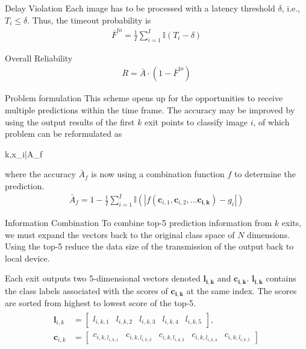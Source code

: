 \begin{enumdescript}
\begin{enumdescript}
\begin{enumdescript}
			\item[Delay Violation] Each image has to be processed with a latency threshold $ \delta $, i.e., $ T_{i} \leq \delta $. Thus, the timeout probability is
			\begin{align}
			\overline{F}^{to}=\frac{1}{I}\sum_{i=1}^{I} \mathbb{I}\left(T_{i}-\delta\right)
			\end{align}
			\item[Overall Reliability]\begin{align}
			R= \bar{A} \cdot (1-\overline{F}^{to})
			\end{align}
			
		\end{enumdescript}
		\item[Problem formulation] 
		This scheme opens up for the opportunities to receive multiple predictions within the time frame. The accuracy may be improved by using the output results of the first $ k $ exit points to classify image $ i $, of which problem can be reformulated as
		\begin{maxi}
			{k,x_i}{\bar{A}_f}
			{}{}
		\end{maxi}
		where the accuracy $ \bar{A}_f $ is now using a combination function $ f $ to determine the prediction.
		\begin{align*}
		\bar{A}_f = 1 - \frac{1}{I} \sum_{i=1}^{I}\mathbb{I}\left(\left|f\left(\mathbf{c}_{i,1}, \mathbf{c}_{i,2}, \dots \mathbf{c_{i,k}}\right)-g_i\right|\right)
		\end{align*}
		
		\item[Information Combination] To combine top-5 prediction information from $ k $ exits, we must expand the vectors back to the original class space of $ N $ dimensions. Using the top-5 reduce the data size of the transmission of the output back to local device. 
		
		Each exit outputs two 5-dimensional vectors denoted $\mathbf{l_{i,k}}$ and $ \mathbf{c_{i,k}}  $.
		$\mathbf{l_{i,k}}$ contains the class labels associated with the scores of $ \mathbf{c_{i,k}}  $ at the same index. The scores are sorted from highest to lowest score of the top-5.
		\begin{align}
		\begin{split}
		\mathbf{l}_{i,k} &= \begin{bmatrix}
		l_{i,k,1} & l_{i,k,2} & l_{i,k,3} & l_{i,k,4} & l_{i,k,5}
		\end{bmatrix}, \\
		\mathbf{c}_{i,k} &= \begin{bmatrix}
		c_{i,k,l_{i,k,1}} & c_{i,k,l_{i,k,2}} & c_{i,k,l_{i,k,3}} & c_{i,k,l_{i,k,4}} & c_{i,k,l_{i,k,5}}
		\end{bmatrix}
		\end{split}
		\end{align}
		

\end{enumdescript}
\end{enumdescript}
